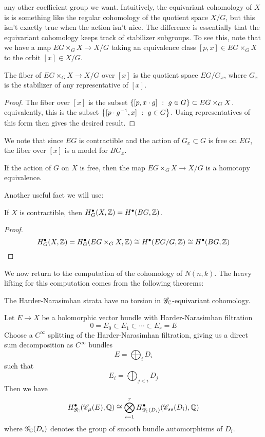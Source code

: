 any other coefficient group we want. Intuitively, the equivariant cohomology of
$X$ is is something like the regular cohomology of the quotient space $X/G$, but
this isn't exactly true when the action isn't nice. The difference is essentially
that the equivariant cohomology keeps track of stabilizer subgroups. To
see this, note that we have a map $EG\times_G X \to X/G$ taking an
equivalence class $[p,x] \in EG\times_G X$ to the orbit $[x] \in X/G$.
%
\begin{prop}
The fiber of $EG\times_G X \to X/G$ over $[x]$ is the quotient space $EG/G_x$, where
$G_x$ is the stabilizer of any representative of $[x]$.
\end{prop}
%
\begin{proof}
The fiber over $[x]$ is the subset $\left\lbrace [p,x\cdot g] ~:~ g \in G \right\rbrace\subset EG \times_G X$.
equivalently, this is the subset $\left\lbrace [p\cdot g^{-1},x] ~:~ g \in G \right\rbrace$. Using
representatives of this form then gives the desired result.
\end{proof}
%
We note that since $EG$ is contractible and the action of $G_x \subset G$
is free on $EG$, the fiber over $[x]$ is a model for $BG_x$.
%
\begin{cor}
If the action of $G$ on $X$ is free, then the map $EG\times_G X \to X/G$
is a homotopy equivalence.
\end{cor}
%
Another useful fact we will use:
%
\begin{cor}
If $X$ is contractible, then $H^\bullet_G(X,\mathbb{Z}) = H^\bullet(BG,\mathbb{Z})$.
\end{cor}
%
\begin{proof}
\[
H^\bullet_G(X,\mathbb{Z}) = H^\bullet_G(EG\times_G X, \mathbb{Z}) \cong H^\bullet(EG/G,\mathbb{Z})
\cong H^\bullet(BG,\mathbb{Z})
\]
\end{proof}
%
We now return to the computation of the cohomology of $N(n,k)$. The heavy
lifting for this computation comes from the following theorems:
%
\begin{thm}
The Harder-Narasimhan strata have no torsion in $\mathscr{G}_{\mathbb{C}}$-equivariant
cohomology.
\end{thm}
%
\begin{thm}
Let $E \to X$ be a holomorphic vector bundle with Harder-Narasimhan filtration
\[
0 = E_0 \subset E_1 \subset \cdots \subset E_r = E
\]
Choose a $C^\infty$ splitting of the Harder-Narasimhan filtration, giving us a direct
sum decomposition as $C^\infty$ bundles
\[
E = \bigoplus_i D_i
\]
such that
\[
E_i = \bigoplus_{j < i} D_j
\]
Then we have
\[
H^\bullet_{\mathscr{G}_{\mathbb{C}}}(\mathscr{C}_\mu(E),\mathbb{Q}) \cong
\bigotimes_{i=1}^r H^\bullet_{\mathscr{G}_{\mathbb{C}}(D_i)}(\mathscr{C}_{ss}(D_i),\mathbb{Q})
\]
where $\mathscr{G}_{\mathbb{C}}(D_i)$ denotes the group of smooth bundle automorphisms of $D_i$.
\end{thm}
